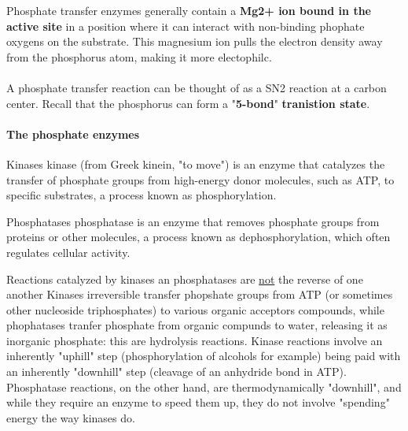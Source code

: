 \documentclass[../main.tex]{subfiles}
\begin{document}
Phosphate transfer enzymes generally contain a \textbf{Mg2+ ion bound in the active site} in a position where it can interact with non-binding phophate oxygens on the substrate. This magnesium ion pulls the electron density away from the phosphorus atom, making it more electophilc. \\
\\
A phosphate transfer reaction can be thought of as a SN2 reaction at a carbon center. Recall that the phosphorus can form a "\textbf{5-bond}" \textbf{tranistion state}.


\paragraph{The phosphate enzymes}
\begin{DefWithTitle}{Kinases}
	\gls{kinase} (from Greek kinein, "to move") is an enzyme that catalyzes the transfer of phosphate groups from high-energy donor molecules, such as ATP, to specific substrates, a process known as phosphorylation.
\end{DefWithTitle}
\begin{DefWithTitle}{Phosphatases}
	\gls{phosphatase} is an enzyme that removes phosphate groups from proteins or other molecules, a process known as dephosphorylation, which often regulates cellular activity.
\end{DefWithTitle}
\begin{RemarkWithTitel}{Reactions catalyzed by kinases an phosphatases are \underline{not} the reverse of one another}
	Kinases irreversible transfer phopshate groups from ATP (or sometimes other nucleoside triphosphates) to various organic acceptors compounds, while phophatases tranfer phosphate from organic compunds to water, releasing it as inorganic phosphate: this are hydrolysis reactions. Kinase reactions involve an inherently "uphill" step (phosphorylation of alcohols for example) being paid with an inherently "downhill" step (cleavage of an anhydride bond in ATP). Phosphatase reactions, on the other hand, are thermodynamically "downhill", and while they require an enzyme to speed them up, they do not involve "spending" energy the way kinases do. 
\end{RemarkWithTitel} 
\end{document}
